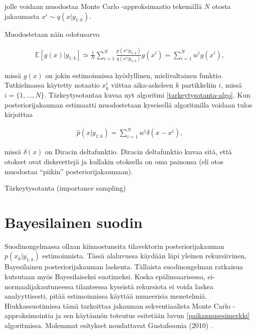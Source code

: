 \documentclass[
  12pt,
  a4paper, twoside]{book}
\begin{document}
\noindent jolle voidaan muodostaa Monte Carlo -approksimaatio tekemällä \(N\) otosta jakaumasta \(x^i \sim q(x|y_{1:k})\).

Muodostetaan näin odotusarvo

\begin{align}
\mathbb{E}[g(x)|y_{1:k}]\simeq\frac{1}{N}\sum_{i=1}^N\frac{p(x^i|y_{1:k})}{q(x^i|y_{1:k})}g(x^i)=\sum_{i=1}^Nw^ig(x^i),
\end{align}

\noindent missä \(g(x)\) on jokin estimoinnissa hyödyllinen, mielivaltainen funktio. Tutkielmassa käytetty notaatio \(x_k^i\) viittaa aika-askeleen \(k\) partikkeliin \(i\), missä \(i=\{1,\ldots,N\}\). Tärkeytysotantaa kuvaa nyt algoritmi \ref{tarkeytysotanta-algo}. Kun posteriorijakauman estimaatti muodostetaan kyseisellä algoritmilla voidaan tulos kirjoittaa

\begin{align}
\hat{p}(x|y_{1:k})=\sum_{i=1}^{N}w^i \delta(x-x^i),
\end{align}

\noindent missä \(\delta(x)\) on Diracin deltafunktio. Diracin deltafunktio kuvaa sitä, että otokset ovat diskreettejä ja kullakin otoksella on oma painonsa (eli otos muodostaa ``piikin'' posteriorijakaumaan).

\begin{algorithm}[H]
\label{tarkeytysotanta-algo}
\DontPrintSemicolon
{}
\caption{Tärkeytysotanta (importance sampling)}
\end{algorithm}

\section{Bayesilainen suodin} \label{bayesilainen-suodin}

Suodinongelmassa ollaan kiinnostuneita tilavektorin posteriorijakauman \(p(x_k|y_{1:k})\) estimoinnista. Tässä alaluvussa käydään läpi yleinen rekursiivinen, Bayesilainen posteriorijakauman laskenta. Tällaista suodinongelman ratkaisua kutsutaan myös Bayesilaiseksi suotimeksi. Koska epälineaarisessa, ei-normaalijakautuneessa tilanteessa kyseistä rekursiota ei voida laskea analyyttisesti, pitää estimoinnissa käyttää numeerisia menetelmiä. Hiukkassuotimissa tämä tarkoittaa jakauman sekventiaalista Monte Carlo -approksimointia ja sen käytännön toteutus esitetään luvun \ref{paikannusesimerkki} algoritmissa. Molemmat esitykset noudattavat Gustafssonia (2010) \citep{gustafsson-2010}.
\end{document}

